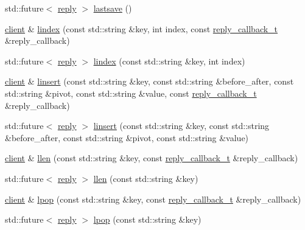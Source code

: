 \begin{DoxyCompactItemize}
\item 
std\+::future$<$ \hyperlink{classcpp__redis_1_1reply}{reply} $>$ \hyperlink{classcpp__redis_1_1client_a6b550a4ecf6eb33abffd664c3124b4f9}{lastsave} ()
\item 
\hyperlink{classcpp__redis_1_1client}{client} \& \hyperlink{classcpp__redis_1_1client_afa409d5b28466837137dfb12c3554070}{lindex} (const std\+::string \&key, int index, const \hyperlink{classcpp__redis_1_1client_a061a1140d36d2eaeda82b09a0bb3f9f2}{reply\+\_\+callback\+\_\+t} \&reply\+\_\+callback)
\item 
std\+::future$<$ \hyperlink{classcpp__redis_1_1reply}{reply} $>$ \hyperlink{classcpp__redis_1_1client_a58458ef30b1fb49584395b6f8584b931}{lindex} (const std\+::string \&key, int index)
\item 
\hyperlink{classcpp__redis_1_1client}{client} \& \hyperlink{classcpp__redis_1_1client_a80799f12e6aafe07872b2bbea453db53}{linsert} (const std\+::string \&key, const std\+::string \&before\+\_\+after, const std\+::string \&pivot, const std\+::string \&value, const \hyperlink{classcpp__redis_1_1client_a061a1140d36d2eaeda82b09a0bb3f9f2}{reply\+\_\+callback\+\_\+t} \&reply\+\_\+callback)
\item 
std\+::future$<$ \hyperlink{classcpp__redis_1_1reply}{reply} $>$ \hyperlink{classcpp__redis_1_1client_ab8d167d78e3c956fd1ade0e2f992f46a}{linsert} (const std\+::string \&key, const std\+::string \&before\+\_\+after, const std\+::string \&pivot, const std\+::string \&value)
\item 
\hyperlink{classcpp__redis_1_1client}{client} \& \hyperlink{classcpp__redis_1_1client_a2e0a911a6bb87224896b7c33da7ac058}{llen} (const std\+::string \&key, const \hyperlink{classcpp__redis_1_1client_a061a1140d36d2eaeda82b09a0bb3f9f2}{reply\+\_\+callback\+\_\+t} \&reply\+\_\+callback)
\item 
std\+::future$<$ \hyperlink{classcpp__redis_1_1reply}{reply} $>$ \hyperlink{classcpp__redis_1_1client_a2890fccb9efd08b38195c8fb5fd1651e}{llen} (const std\+::string \&key)
\item 
\hyperlink{classcpp__redis_1_1client}{client} \& \hyperlink{classcpp__redis_1_1client_ad4060807b9b9aa330ad11dedd69e80b8}{lpop} (const std\+::string \&key, const \hyperlink{classcpp__redis_1_1client_a061a1140d36d2eaeda82b09a0bb3f9f2}{reply\+\_\+callback\+\_\+t} \&reply\+\_\+callback)
\item 
std\+::future$<$ \hyperlink{classcpp__redis_1_1reply}{reply} $>$ \hyperlink{classcpp__redis_1_1client_ab6ebbc7b2e6f43f2b5607a4b5471694e}{lpop} (const std\+::string \&key)

\end{DoxyCompactItemize}
